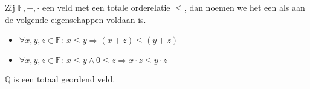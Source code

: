 \documentclass[main.tex]{subfiles}
\begin{document}
\begin{de}
  Zij $\mathbb{F},+,\cdot$ een veld met een totale orderelatie $\le$, dan noemen we het een  als aan de volgende eigenschappen voldaan is.
  \begin{itemize}
  \item $\forall x,y,z \in \mathbb{F}:\ x \le y \Rightarrow (x+z) \le (y+z)$
  \item $\forall x,y,z \in \mathbb{F}:\ x \le y \wedge 0 \le z \Rightarrow x\cdot z \le y\cdot z$
  \end{itemize}
\end{de}

\begin{pr}
  $\mathbb{Q}$ is een totaal geordend veld.

\end{pr}
\end{document}
